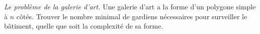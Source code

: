 \emph{Le problème de la galerie d'art.} Une galerie d'art a la forme d'un polygone simple à $n$ côtés. Trouver le nombre minimal de gardiens nécessaires pour surveiller le bâtiment, quelle que soit la complexité de sa forme.
